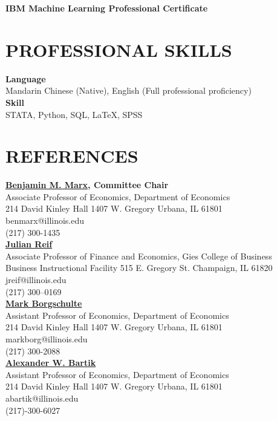 \documentclass[a4paper,9pt]{extarticle}
\begin{document}
\noindent
\textbf{IBM Machine Learning Professional Certificate} \\

\section*{PROFESSIONAL SKILLS}

\noindent
\newline
\textbf{Language} \\
Mandarin Chinese (Native), English (Full professional proficiency) \\

\noindent
\textbf{Skill} \\
STATA, Python, SQL, \LaTeX, SPSS \\


\section*{REFERENCES}

\noindent
\newline
\textbf{\href{https://sites.google.com/site/benjaminmmarx/}{Benjamin M. Marx}, Committee Chair} \\
Associate Professor of Economics, Department of Economics \\
214 David Kinley Hall
1407 W. Gregory
Urbana, IL  61801\\
benmarx@illinois.edu \\
(217) 300-1435 \\

\noindent
\textbf{\href{https://julianreif.com}{Julian Reif}} \\
Associate Professor of Finance and Economics, Gies College of Business \\
Business Instructional Facility 515 E. Gregory St.
Champaign, IL 61820\\
jreif@illinois.edu \\
(217) 300–0169 \\

\noindent
\textbf{\href{https://sites.google.com/site/markborgschulte/home}{Mark Borgschulte}} \\
Assistant Professor of Economics, Department of Economics \\
214 David Kinley Hall
1407 W. Gregory
Urbana, IL  61801\\
markborg@illinois.edu \\
(217) 300-2088 \\
 
\noindent
\textbf{\href{https://www.alexbartik.com}{Alexander W. Bartik}} \\
Assistant Professor of Economics, Department of Economics \\
214 David Kinley Hall
1407 W. Gregory
Urbana, IL  61801\\
abartik@illinois.edu \\
(217)-300-6027 \\
\end{document}

